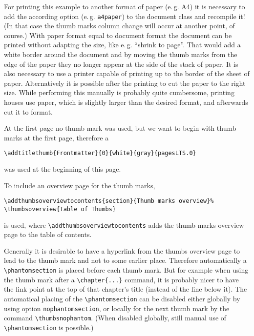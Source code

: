 \documentclass[twoside,british]{article}[2007/10/19]%
\begin{document}
For printing this example to another format of paper (e.\,g. A4)
it is necessary to add the according option (e.\,g. \verb|a4paper|)
to the document class and recompile it! (In that case the
thumb marks column change will occur at another point, of course.)
With paper format equal to document format the document can be printed
without adapting the size, like e.\,g.
\textquotedblleft shrink to page\textquotedblright .
That would add a white border around the document
and by moving the thumb marks from the edge of the paper they no longer appear
at the side of the stack of paper. It is also necessary to use a printer
capable of printing up to the border of the sheet of paper. Alternatively
it is possible after the printing to cut the paper to the right size.
While performing this manually is probably quite cumbersome,
printing houses use paper, which is slightly larger than the
desired format, and afterwards cut it to format.

\newpage


At the first page no thumb mark was used, but we want to begin with thumb marks
at the first page, therefore a
\begin{verbatim}
\addtitlethumb{Frontmatter}{0}{white}{gray}{pagesLTS.0}
\end{verbatim}
was used at the beginning of this page.

\newpage

\tableofcontents

\newpage

To include an overview page for the thumb marks,
\begin{verbatim}
\addthumbsoverviewtocontents{section}{Thumb marks overview}%
\thumbsoverview{Table of Thumbs}
\end{verbatim}
is used, where \verb|\addthumbsoverviewtocontents| adds the thumb
marks overview page to the table of contents.

\smallskip

Generally it is desirable to have a hyperlink from the thumbs overview page
to lead to the thumb mark and not to some earlier place. Therefore automatically
a \verb|\phantomsection| is placed before each thumb mark. But for example when
using the thumb mark after a \verb|\chapter{...}| command, it is probably nicer
to have the link point at the top of that chapter's title (instead of the line
below it). The automatical placing of the \verb|\phantomsection| can be disabled
either globally by using option \texttt{nophantomsection}, or locally for the next
thumb mark by the command \verb|\thumbsnophantom|. (When disabled globally,
still manual use of \verb|\phantomsection| is possible.)
\end{document}
